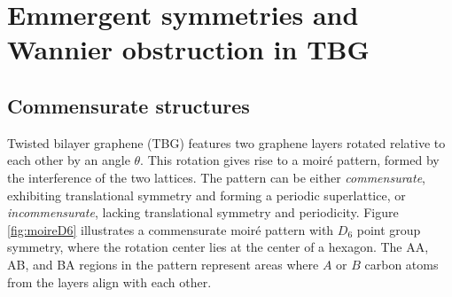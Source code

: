 



\chapter{Emmergent symmetries and Wannier obstruction in TBG} \label{ch:emmergent_symm_wannier_obstruction}

\section{Commensurate structures} \label{sec:tbg_commensurate}

Twisted bilayer graphene (TBG) features two graphene layers rotated relative to each other by an angle \( \theta \). This rotation gives rise to a moiré pattern, formed by the interference of the two lattices. The pattern can be either \textit{commensurate}, exhibiting translational symmetry and forming a periodic superlattice, or \textit{incommensurate}, lacking translational symmetry and periodicity. Figure \ref{fig:moireD6} illustrates a commensurate moiré pattern with \( D_6 \) point group symmetry, where the rotation center lies at the center of a hexagon. The AA, AB, and BA regions in the pattern represent areas where \( A \) or \( B \) carbon atoms from the layers align with each other.

